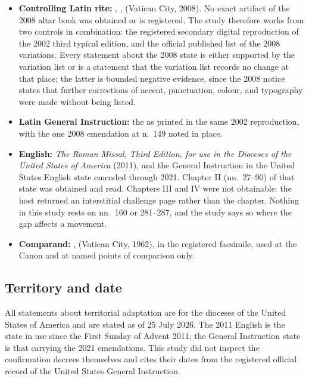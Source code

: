 \begin{itemize}[itemsep=0.2em]
\item \textbf{Controlling Latin rite:} , ,
 (Vatican City, 2008). No exact artifact of the 2008 altar book was
obtained or is registered. The study therefore works from two controls in combination: the
registered secondary digital reproduction of the 2002 third typical edition, and the official
published list of the 2008 variations. Every statement about the 2008 state is either supported
by the variation list or is a statement that the variation list records no change at that place;
the latter is bounded negative evidence, since the 2008 notice states that further corrections of
accent, punctuation, colour, and typography were made without being listed.
\item \textbf{Latin General Instruction:} the  as
printed in the same 2002 reproduction, with the one 2008 emendation at n.\ 149 noted in place.
\item \textbf{English:} \emph{The Roman Missal, Third Edition, for use in the Dioceses of the
United States of America} (2011), and the General Instruction in the United States English state
emended through 2021. Chapter II (nn.\ 27--90) of that state was obtained and read. Chapters III
and IV were not obtainable: the host returned an interstitial challenge page rather than the
chapter. Nothing in this study rests on nn.\ 160 or 281--287, and the study says so where the
gap affects a movement.
\item \textbf{Comparand:} ,  (Vatican City, 1962),
in the registered facsimile, used at the Canon and at named points of comparison only.
\end{itemize}

\subsection*{Territory and date}

All statements about territorial adaptation are for the dioceses of the United States of
America and are stated as of 25 July 2026. The 2011 English is the state in use since the First
Sunday of Advent 2011; the General Instruction state is that carrying the 2021 emendations. This
study did not inspect the confirmation decrees themselves and cites their dates from the
registered official record of the United States General Instruction.

